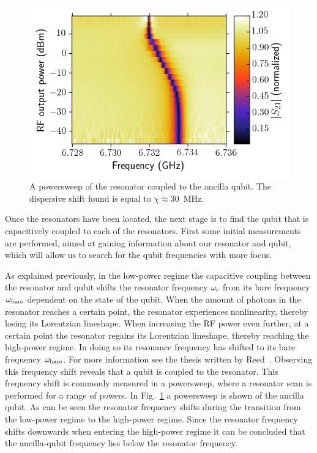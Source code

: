         \begin{figure}
          \begin{center}
          \vspace{-30pt}
            \includegraphics[width=\textwidth]{Figures/Qubit characterization/Powersweep.png}
          \end{center}
          \vspace{-20 pt}
          \caption{A powersweep of the resonator coupled to the ancilla qubit. The dispersive shift found is equal to $\chi\approx$\SI{30}{\mega \hertz}.}
          \label{fig:powersweep}
        \end{figure}

        Once the resonators have been located, the next stage is to find the qubit that is capacitively coupled to each of the resonators. First some initial measurements are performed, aimed at gaining information about our resonator and qubit, which will allow us to search for the qubit frequencies with more focus.

        As explained previously, in the low-power regime the capacitive coupling between the resonator and qubit shifts the resonator frequency $\omega_\text{r}$ from its bare frequency $\omega_\text{bare}$ dependent on the state of the qubit. When the amount of photons in the resonator reaches a certain point, the resonator experiences nonlinearity, thereby losing its Lorentzian lineshape. When increasing the RF power even further, at a certain point the resonator regains its Lorentzian lineshape, thereby reaching the high-power regime. In doing so its resonance frequency has shifted to its bare frequency $\omega_\text{bare}$. For more information see the thesis written by Reed~\cite{Reed}. Observing this frequency shift reveals that a qubit is coupled to the resonator. This frequency shift is commonly measured in a powersweep, where a resonator scan is performed for a range of powers. In Fig.~\ref{fig:powersweep} a powersweep is shown of the ancilla qubit. As can be seen the resonator frequency shifts during the transition from the low-power regime to the high-power regime. Since the resonator frequency shifts downwards when entering the high-power regime it can be concluded that the ancilla-qubit frequency lies below the resonator frequency.

